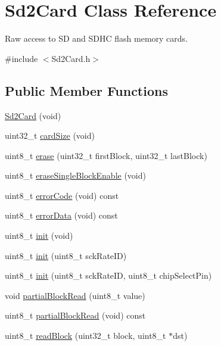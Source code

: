\hypertarget{class_sd2_card}{}\section{Sd2\+Card Class Reference}
\label{class_sd2_card}


Raw access to SD and S\+D\+HC flash memory cards.  




{\ttfamily \#include $<$Sd2\+Card.\+h$>$}

\subsection*{Public Member Functions}
\begin{DoxyCompactItemize}
\item 
\hyperlink{class_sd2_card_af85a5ec4f5f4ec89deb8936c3fd7de65}{Sd2\+Card} (void)
\item 
uint32\+\_\+t \hyperlink{class_sd2_card_a862473431cc314238bfccdc531a70d3a}{card\+Size} (void)
\item 
uint8\+\_\+t \hyperlink{class_sd2_card_af49fb720fad1d3ea9f5782da0d87fc0b}{erase} (uint32\+\_\+t first\+Block, uint32\+\_\+t last\+Block)
\item 
uint8\+\_\+t \hyperlink{class_sd2_card_a2e3998f6e910a2936d3ef54bf082b2ce}{erase\+Single\+Block\+Enable} (void)
\item 
uint8\+\_\+t \hyperlink{class_sd2_card_a3e9f71d0b6d74580fca96dbca1e3a3ba}{error\+Code} (void) const
\item 
uint8\+\_\+t \hyperlink{class_sd2_card_a51f51804473a8fefd29cabbc36018a49}{error\+Data} (void) const
\item 
uint8\+\_\+t \hyperlink{class_sd2_card_afaec9a22060626b02c07a09eff2e9113}{init} (void)
\item 
uint8\+\_\+t \hyperlink{class_sd2_card_ad99b2d2156c9746065c52839ef679354}{init} (uint8\+\_\+t sck\+Rate\+ID)
\item 
uint8\+\_\+t \hyperlink{class_sd2_card_a919c789eb9b140426c706f0862780978}{init} (uint8\+\_\+t sck\+Rate\+ID, uint8\+\_\+t chip\+Select\+Pin)
\item 
void \hyperlink{class_sd2_card_aa279ac05b3f25acbf10cc424a25750da}{partial\+Block\+Read} (uint8\+\_\+t value)
\item 
uint8\+\_\+t \hyperlink{class_sd2_card_af3de0f1fdfc86816f45b555841ff291b}{partial\+Block\+Read} (void) const
\item 
uint8\+\_\+t \hyperlink{class_sd2_card_ae26d840449a42d45af464fb81b92e2ab}{read\+Block} (uint32\+\_\+t block, uint8\+\_\+t $\ast$dst)

\end{DoxyCompactItemize}
